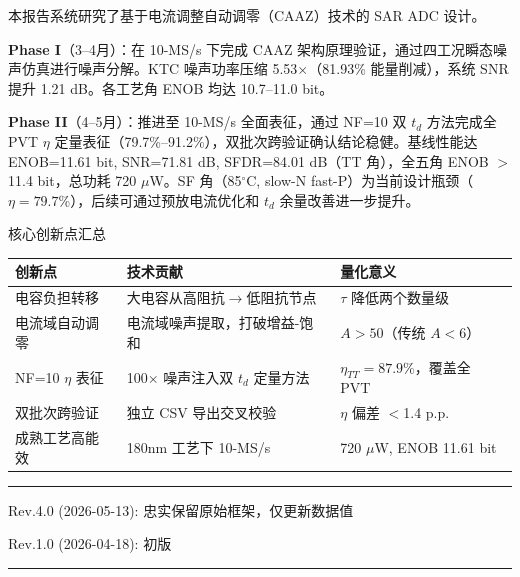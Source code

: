 \documentclass[11pt,a4paper,UTF8]{ctexart}
\begin{document}
本报告系统研究了基于电流调整自动调零（CAAZ）技术的 SAR ADC 设计。

\textbf{Phase I}（3--4月）：在 10-MS/s 下完成 CAAZ 架构原理验证，通过四工况瞬态噪声仿真进行噪声分解。KTC 噪声功率压缩 5.53$\times$（81.93\% 能量削减），系统 SNR 提升 1.21 dB。各工艺角 ENOB 均达 10.7--11.0 bit。

\textbf{Phase II}（4--5月）：推进至 10-MS/s 全面表征，通过 NF=10 双 $t_d$ 方法完成全 PVT $\eta$ 定量表征（79.7\%--91.2\%），双批次跨验证确认结论稳健。基线性能达 ENOB=11.61 bit, SNR=71.81 dB, SFDR=84.01 dB（TT 角），全五角 ENOB $>$11.4 bit，总功耗 720 $\mu$W。SF 角（85$^\circ$C, slow-N fast-P）为当前设计瓶颈（$\eta=79.7\%$），后续可通过预放电流优化和 $t_d$ 余量改善进一步提升。

\begin{findbox}{核心创新点汇总}
\begin{tabular}{lll}\toprule
\textbf{创新点} & \textbf{技术贡献} & \textbf{量化意义} \\\midrule
电容负担转移 & 大电容从高阻抗$\rightarrow$低阻抗节点 & $\tau$ 降低两个数量级 \\
电流域自动调零 & 电流域噪声提取，打破增益-饱和 & $A > 50$（传统 $A < 6$） \\
NF=10 $\eta$ 表征 & 100$\times$ 噪声注入双 $t_d$ 定量方法 & $\eta_{TT}=87.9\%$，覆盖全 PVT \\
双批次跨验证 & 独立 CSV 导出交叉校验 & $\eta$ 偏差 $<$1.4 p.p. \\
成熟工艺高能效 & 180nm 工艺下 10-MS/s & 720 $\mu$W, ENOB 11.61 bit \\\bottomrule
\end{tabular}
\end{findbox}

\vspace{1cm}
\begin{center}\rule{0.5\textwidth}{0.4pt}
{\small Rev.4.0 (2026-05-13): 忠实保留原始框架，仅更新数据值}

{\small Rev.1.0 (2026-04-18): 初版}
\rule{0.5\textwidth}{0.4pt}
\end{center}
\end{document}
